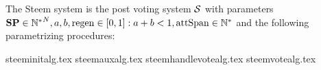 \begin{definition}
  The Steem system is the post voting system $\mathcal{S}$ with parameters $\mathrm{\textbf{SP}}
  \in {\mathbb{N}^*}^N, a, b, \mathrm{regen} \in \left[0, 1\right]: a + b < 1, \mathrm{attSpan}
  \in \mathbb{N}^*$ and the following parametrizing procedures:
\end{definition}
{steeminitalg.tex}
{steemauxalg.tex}
{steemhandlevotealg.tex}
{steemvotealg.tex}
